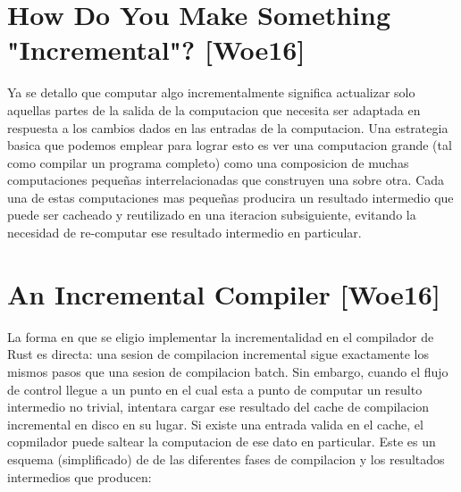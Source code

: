 \documentclass[12pt, a4paper]{report}
\begin{document}
  \section*{How Do You Make Something "Incremental"? [Woe16]}

    Ya se detallo que computar algo incrementalmente significa actualizar solo aquellas partes de la salida de la computacion que necesita ser adaptada en respuesta a los cambios dados en las entradas de la computacion.
    Una estrategia basica que podemos emplear para lograr esto es ver una computacion grande (tal como compilar un programa completo) como una composicion de muchas computaciones pequeñas interrelacionadas que construyen una sobre otra.
    Cada una de estas computaciones mas pequeñas producira un resultado intermedio que puede ser cacheado y reutilizado en una iteracion subsiguiente, evitando la necesidad de re-computar ese resultado intermedio en particular.
    \cite{rust_blog_incremental_compilation}

  \section*{An Incremental Compiler [Woe16]}

    La forma en que se eligio implementar la incrementalidad en el compilador de Rust es directa: una sesion de compilacion incremental sigue exactamente los mismos pasos que una sesion de compilacion batch.
    Sin embargo, cuando el flujo de control llegue a un punto en el cual esta a punto de computar un resulto intermedio no trivial, intentara cargar ese resultado del cache de compilacion incremental en disco en su lugar.
    Si existe una entrada valida en el cache, el copmilador puede saltear la computacion de ese dato en particular.
    Este es un esquema (simplificado) de de las diferentes fases de compilacion y los resultados intermedios que producen:
    \cite{rust_blog_incremental_compilation}
\end{document}
